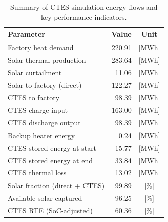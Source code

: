\renewcommand{\arraystretch}{1.2}
\begin{table}[h]
\centering
\begin{tabular}{l|r c}
\hline
Parameter & Value & Unit \\
\hline
Factory heat demand & 220.91 & [MWh] \\
Solar thermal production & 283.64 & [MWh] \\
Solar curtailment & 11.06 & [MWh] \\
Solar to factory (direct) & 122.27 & [MWh] \\
CTES to factory & 98.39 & [MWh] \\
CTES charge input & 163.00 & [MWh] \\
CTES discharge output & 98.39 & [MWh] \\
Backup heater energy & 0.24 & [MWh] \\
CTES stored energy at start & 15.77 & [MWh] \\
CTES stored energy at end & 33.84 & [MWh] \\
CTES thermal loss & 13.02 & [MWh] \\
\hline
Solar fraction (direct + CTES) & 99.89 & [\%] \\
Available solar captured & 96.25 & [\%] \\
CTES RTE (SoC-adjusted) & 60.36 & [\%] \\
\hline
\end{tabular}
\caption{Summary of CTES simulation energy flows and key performance indicators.}
\label{tab:ctes-simulation-summary}
\end{table}
